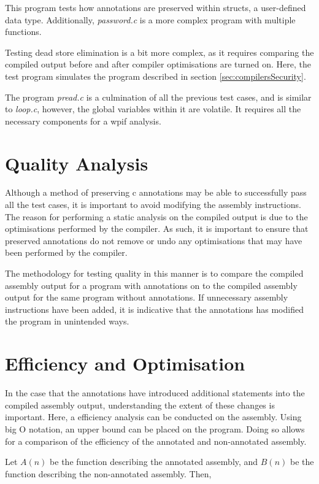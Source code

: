 This program tests how annotations are preserved within structs, a user-defined data type. Additionally, \textit{password.c} is a more complex program with multiple functions.

Testing dead store elimination is a bit more complex, as it requires comparing the compiled output before and after compiler optimisations are turned on. Here, the test program simulates the program described in section \ref{sec:compilersSecurity}.

The program \textit{pread.c} is a culmination of all the previous test cases, and is similar to \textit{loop.c}, however, the global variables within it are volatile. It requires all the necessary components for a wpif analysis.

\section{Quality Analysis}
\label{sec:qualityAnalysis}
Although a method of preserving c annotations may be able to successfully pass all the test cases, it is important to avoid modifying the assembly instructions. The reason for performing a static analysis on the compiled output is due to the optimisations performed by the compiler. As such, it is important to ensure that preserved annotations do not remove or undo any optimisations that may have been performed by the compiler. 

The methodology for testing quality in this manner is to compare the compiled assembly output for a program with annotations on to the compiled assembly output for the same program without annotations. If unnecessary assembly instructions have been added, it is indicative that the annotations has modified the program in unintended ways. 

\section{Efficiency and Optimisation}
\label{sec:runtimeEfficiencyOptimisation}
In the case that the annotations have introduced additional statements into the compiled assembly output, understanding the extent of these changes is important. Here, a efficiency analysis can be conducted on the assembly. Using big O notation, an upper bound can be placed on the program. Doing so allows for a comparison of the efficiency of the annotated and non-annotated assembly. 

Let \(A(n)\) be the function describing the annotated assembly, and \(B(n)\) be the function describing the non-annotated assembly. Then,

